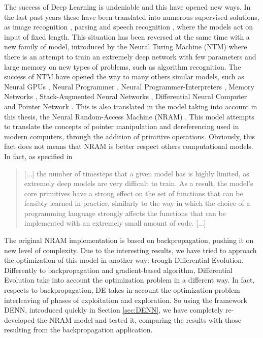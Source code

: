 The success of Deep Learning is undeniable and this have opened new ways. In the last past years these have been translated into numerous supervised solutions, as image recognition \cite{Krizhevsky2012ImageNetCW}, parsing \cite{Vinyals2015GrammarAA} and speech recognition \cite{Chan2015ListenAA}, where the models act on input of fixed length. This situation has been reversed at the same time with a new family of model, introduced by the Neural Turing Machine (NTM) \cite{Graves2014NeuralTM} where there is an attempt to train an extremely deep network with few parameters and large memory on new types of problems, such as algorithm recognition. The success of NTM have opened the way to many others similar models, such as Neural GPUs \cite{Kaiser2015NeuralGL}, Neural Programmer \cite{Neelakantan2015NeuralPI}, Neural Programmer-Interpreters \cite{Reed2015NeuralP}, Memory Networks \cite{Weston2014MemoryN}, Stack-Augmented Neural Networks \cite{Joulin2015InferringAP}, Differential Neural Computer \cite{Graves2016HybridCU} and Pointer Network \cite{Vinyals2015PointerN}.
\newline \newline
This is also translated in the model taking into account in this thesis, the Neural Random-Access Machine (NRAM) \cite{NRAM:2016}. This model attempts to translate the concepts of pointer manipulation and dereferencing used in modern computers, through the addition of primitive operations. Obviously, this fact does not means that NRAM is better respect others computational models. In fact, as specified in \cite{NRAM:2016}
\begin{quote}
[...] the number of timesteps that a given model has is highly limited, as extremely deep models are very difficult to train. As a result, the model’s core primitives have a strong effect on the set of functions that can be feasibly learned in practice, similarly to the way in which the choice of a programming language strongly affects the functions that can be implemented with an extremely small amount of code. [...]
\end{quote}

\newline\newline
The original NRAM implementation is based on backpropagation, pushing it on new level of complexity. Due to the interesting results, we have tried to approach the optimization of this model in another way: trough Differential Evolution. Differently to backpropagation and gradient-based algorithm, Differential Evolution take into account the optimization problem in a different way. In fact, respects to backpropagation, DE takes in account the optimization problem interleaving of phases of exploitation and exploration. So using the framework DENN, introduced quickly in Section \ref{sec:DENN}, we have completely re-developed the NRAM model and tested it, comparing the results with those resulting from the backpropagation application.